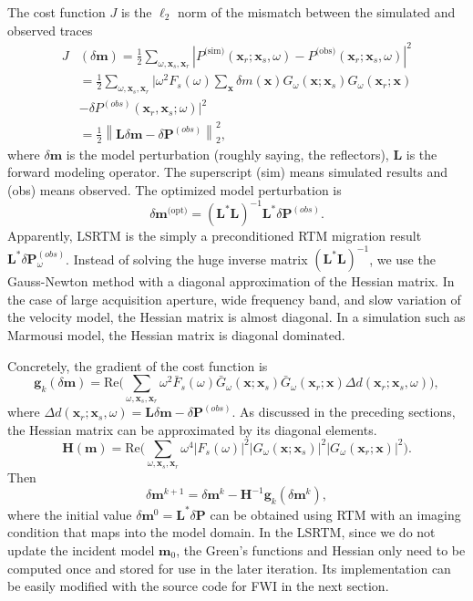 \documentclass[11pt,titlepage]{article}
\newcommand{\bx}{\boldsymbol{x}}
\newcommand{\bg}{\boldsymbol{g}}
\newcommand{\bH}{\boldsymbol{H}}
\newcommand{\bL}{\boldsymbol{L}}
\newcommand{\bm}{\boldsymbol{m}}
\newcommand{\bP}{\boldsymbol{P}}
\theoremstyle{plain}
\theoremstyle{definition}
\theoremstyle{remark}
\numberwithin{equation}{section}
\begin{document}
The cost function $J$ is the $\ell_2$ norm of the mismatch between the simulated and observed traces
  \begin{equation}
  \begin{aligned}
  J&(\delta \bm) = \frac{1}{2} \sum\limits_{\omega,\bx_s,\bx_r}  \left| P^{\text{(sim)}}(\bx_r; \bx_s,  \omega) - P^{\text{(obs)}}(\bx_r; \bx_s, \omega) \right|^2 \\
  &= \frac{1}{2} \sum\limits_{\omega,\bx_s,\bx_r} \Big| \omega^2 F_s(\omega) \sum\limits_{\bx}\delta m(\bx)G_{\omega}(\bx; \bx_s)G_{\omega}(\bx_r; \bx) \\&- \delta P^{(obs)}(\bx_r, \bx_s; \omega) \Big|^2\\
  &= \frac{1}{2} \left\| \bL\delta \bm - \delta\bP^{(obs)}\right\|_2^2,
  \end{aligned}
  \end{equation}
where $\delta \bm$ is the model perturbation (roughly saying, the reflectors), $\bL$ is the forward modeling operator. The superscript (sim) means simulated results and (obs) means observed. The optimized model perturbation is 
    \begin{equation}
    \delta \bm^{\text{(opt)}} = \left( \bL^{*}\bL \right)^{-1} \bL^{*} \delta\bP^{(obs)}.
    \end{equation}
Apparently, LSRTM is the simply a preconditioned RTM migration result $\bL^{*}\delta \bP^{(obs)}_{\omega}$. Instead of solving the huge inverse matrix $(\bL^{*}\bL)^{-1}$,  we use the Gauss-Newton method with a diagonal approximation of the Hessian matrix. In the case of large acquisition aperture, wide frequency band, and slow variation of the velocity model, the Hessian matrix is almost diagonal. In a simulation such as Marmousi model, the Hessian matrix is diagonal dominated. 

Concretely, the gradient of the cost function is
\begin{equation}
\bg_k(\delta\bm)=\text{Re}\bigg(\sum_{\omega,\bx_s,\bx_r } \omega^2  \bar{F}_s(\omega) \bar{G}_\omega(\bx;\bx_s)\bar{ G}_\omega(\bx_r;\bx)\Delta d(\bx_r;\bx_s,\omega)\bigg), 
\end{equation}
where $\Delta d(\bx_r;\bx_s,\omega)=\bL\delta \bm - \delta\bP^{(obs)}$. 
As discussed in the preceding sections, the Hessian matrix can be approximated by its diagonal elements.
\begin{equation}
\bH(\bm)= \text{Re}\bigg( \sum_{\omega,\bx_s,\bx_r} \omega^4 |F_s(\omega)|^2 |G_\omega(\bx;\bx_s)|^2 |G_\omega(\bx_r;\bx)|^2 \bigg).
\end{equation} 
Then
\begin{equation}
\delta \bm^{k+1}=\delta \bm^{k} - \bH^{-1} \bg_k(\delta \bm^k),
\end{equation}
where the initial value $\delta \bm^0=\bL^* \delta \bP$ can be obtained using RTM with an imaging condition that maps into the model domain. In the LSRTM, since we do not update the incident model $\bm_0$, the Green's functions and Hessian only need to be computed once and stored for use in the later iteration. Its implementation can be easily modified with the source code for FWI in the next section.
\end{document}
